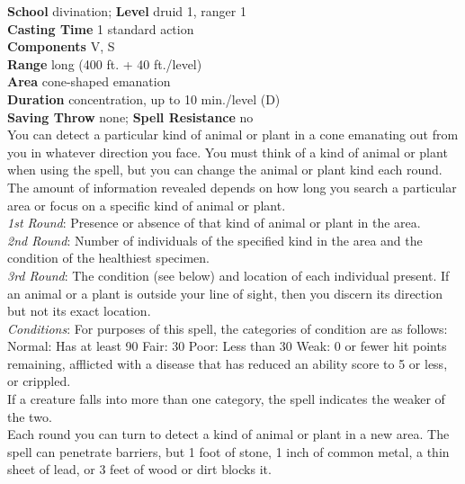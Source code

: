 \textbf{School} divination; \textbf{Level} druid 1, ranger 1\\
\textbf{Casting Time} 1 standard action\\
\textbf{Components} V, S\\
\textbf{Range} long (400 ft. + 40 ft./level)\\
\textbf{Area} cone-shaped emanation\\
\textbf{Duration} concentration, up to 10 min./level (D)\\
\textbf{Saving Throw} none; \textbf{Spell Resistance} no\\
You can detect a particular kind of animal or plant in a cone emanating out from you in whatever direction you face. You must think of a kind of animal or plant when using the spell, but you can change the animal or plant kind each round. The amount of information revealed depends on how long you search a particular area or focus on a specific kind of animal or plant.\\
\textit{1st Round}: Presence or absence of that kind of animal or plant in the area.\\
\textit{2nd Round}: Number of individuals of the specified kind in the area and the condition of the healthiest specimen.\\
\textit{3rd Round}: The condition (see below) and location of each individual present. If an animal or a plant is outside your line of sight, then you discern its direction but not its exact location.\\
\textit{Conditions}: For purposes of this spell, the categories of condition are as follows:\\
Normal: Has at least 90%
Fair: 30%
Poor: Less than 30%
Weak: 0 or fewer hit points remaining, afflicted with a disease that has reduced an ability score to 5 or less, or crippled.\\
If a creature falls into more than one category, the spell indicates the weaker of the two.\\
Each round you can turn to detect a kind of animal or plant in a new area. The spell can penetrate barriers, but 1 foot of stone, 1 inch of common metal, a thin sheet of lead, or 3 feet of wood or dirt blocks it.\\
